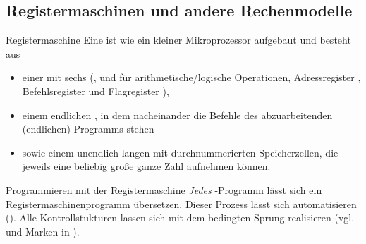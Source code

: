 \addtocounter{subsection}{4}

\subsection{%
    Registermaschinen und andere Rechenmodelle%
}

\begin{Def}{Registermaschine}
    Eine  ist wie ein kleiner Mikroprozessor
    aufgebaut und besteht aus
    \begin{itemize}
        \item einer  mit sechs 
        (,  und  für
        arithmetische/logische Operationen,
        Adressregister , Befehlsregister 
        und Flagregister ),

        \item einem endlichen , in dem nacheinander
        die Befehle
        des abzuarbeitenden (endlichen) Programms stehen

        \item sowie einem unendlich langen  mit
        durchnummerierten Speicherzellen, die jeweils eine beliebig große ganze
        Zahl aufnehmen können.
    \end{itemize}
\end{Def}

\begin{Def}{Programmieren mit der Registermaschine}
    \emph{Jedes} \Ada{}-Programm lässt sich ein Registermaschinenprogramm
    übersetzen.
    Dieser Prozess lässt sich automatisieren ().
    Alle Kontrollstukturen lassen sich mit dem bedingten Sprung
     realisieren (vgl.  und Marken in \Ada{}).
\end{Def}

\pagebreak

